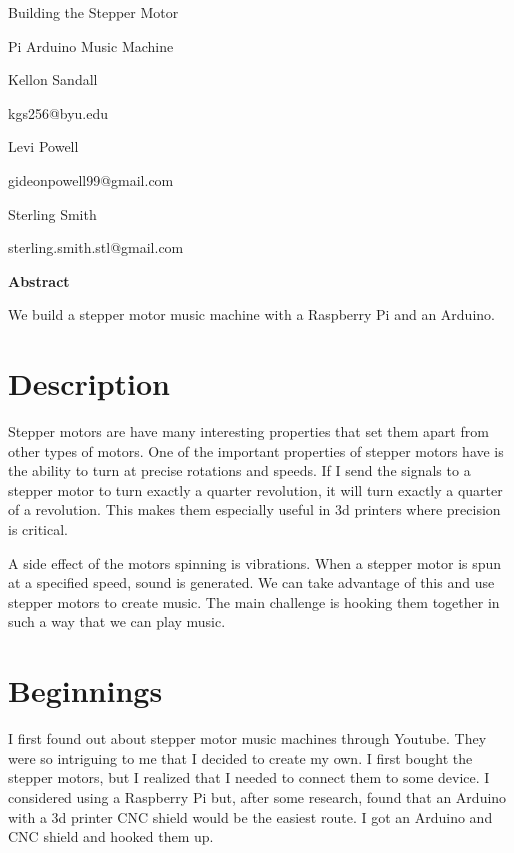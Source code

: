\documentclass[12pt,letterpaper]{article}
\begin{document}
	
	\vspace*{2cm}
	
	\begin{center}
		\Large Building the Stepper Motor 
		
		Pi Arduino Music Machine
		
		\vspace{3cm}
		
		\large 
		Kellon Sandall
		
		kgs256@byu.edu
		
		\vspace{24pt}
		
		Levi Powell
		
		gideonpowell99@gmail.com
		
		\vspace{24pt}
		
		Sterling Smith
		
		sterling.smith.stl@gmail.com
	\end{center}
	
	
	\pagebreak
	
	\large \textbf{Abstract}
	
	\normalsize
	
	We build a stepper motor music machine with a Raspberry Pi and an Arduino. 
	
	
	\section{Description}
	
	Stepper motors are have many interesting properties that set them apart from other types of motors. One of the important properties of stepper motors have is the ability to turn at precise rotations and speeds. If I send the signals to a stepper motor to turn exactly a quarter revolution, it will turn exactly a quarter of a revolution. This makes them especially useful in 3d printers where precision is critical. 
	
	A side effect of the motors spinning is vibrations. When a stepper motor is spun at a specified speed, sound is generated. We can take advantage of this and use stepper motors to create music. The main challenge is hooking them together in such a way that we can play music. 
	
	\section{Beginnings}
	
	I first found out about stepper motor music machines through Youtube. They were so intriguing to me that I decided to create my own. I first bought the stepper motors, but I realized that I needed to connect them to some device. I considered using a Raspberry Pi but, after some research, found that an Arduino with a 3d printer CNC shield would be the easiest route. I got an Arduino and CNC shield and hooked them up. 
	
\end{document}
